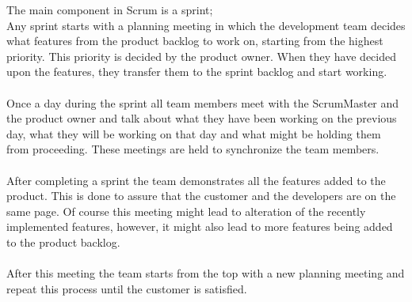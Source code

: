 The main component in Scrum is a sprint; \\
Any sprint starts with a planning meeting in which the development team decides what features from the product backlog to work on, starting from the highest priority. This priority is decided by the product owner. When they have decided upon the features, they transfer them to the sprint backlog and start working. \\
 \\
Once a day during the sprint all team members meet with the ScrumMaster and the product owner and talk about what they have been working on the previous day, what they will be working on that day and what might be holding them from proceeding. These meetings are held to synchronize the team members.\\
 \\
After completing a sprint the team demonstrates all the features added to the product. This is done to assure that the customer and the developers are on the same page. Of course this meeting might lead to alteration of the recently implemented features, however, it might also lead to more features being added to the product backlog.\\
 \\
After this meeting the team starts from the top with a new planning meeting and repeat this process until the customer is satisfied.

